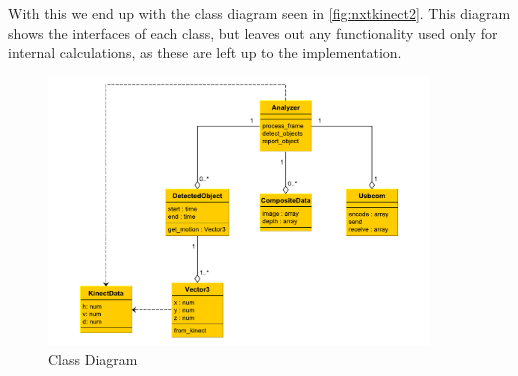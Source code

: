 With this we end up with the class diagram seen in \autoref{fig:nxtkinect2}. This diagram shows the interfaces
of each class, but leaves out any functionality used only for internal calculations, as these are left up to 
the implementation.

\begin{figure}[hbtp]
\includegraphics[width=0.90\textwidth]{img/nxtkinect2.pdf}
\caption{Class Diagram} 
\label{fig:nxtkinect2} 
\end{figure}

